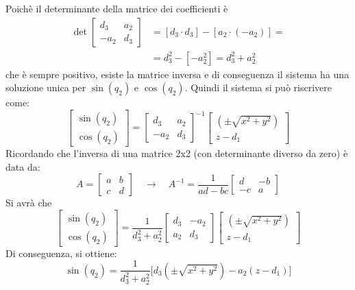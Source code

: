 ﻿\documentclass[11pt, a4paper]{article}
\begin{document}
Poichè il determinante della matrice dei coefficienti è
\begin{align*}
    \det \begin{bmatrix}
        d_{3} & a_{2} \\
        -a_{2} & d_{3}
    \end{bmatrix} &= [d_{3} \cdot d_{3}] - [a_{2} \cdot (- a_{2})] =\\
    & = d_{3}^{2} - [-a_{2}^{2}] = d_{3}^{2} + a_{2}^{2}
\end{align*}
che è sempre positivo, esiste la matrice inversa e di conseguenza il sistema ha una soluzione unica per $\sin(q_2)$ e $\cos(q_2)$. Quindi il sistema si può riscrivere come:
\[
    \begin{bmatrix}
        \sin(q_2)\\
        \cos(q_2)
    \end{bmatrix}
    =
    \begin{bmatrix}
        d_{3} & a_{2} \\
        -a_{2} & d_{3}
    \end{bmatrix}^{-1}
    \begin{bmatrix}
        (\pm \sqrt{x^2+y^2}) \\
        z - d_1
    \end{bmatrix}
\]
Ricordando che l'inversa di una matrice 2x2 (con determinante diverso da zero) è data da:
\[
A=\begin{bmatrix}
a & b\\
c & d
\end{bmatrix}
\quad\longrightarrow\quad
A^{-1}=
\frac{1}{ad-bc}
\begin{bmatrix}
    d & -b \\
    -c & a
\end{bmatrix}
\]
Si avrà che
\[
    \begin{bmatrix}
        \sin(q_2)\\
        \cos(q_2)
    \end{bmatrix}
    =
    \frac{1}{d_{3}^{2} + a_{2}^{2}}
    \begin{bmatrix}
        d_{3} & -a_{2} \\
        a_{2} & d_{3}
    \end{bmatrix}
    \begin{bmatrix}
        (\pm \sqrt{x^2+y^2}) \\
        z - d_1
    \end{bmatrix}
\]
Di conseguenza, si ottiene:
\[
    \boxed{
        \sin(q_{2}) = \frac{1}{d_{3}^{2} + a_{2}^{2}} \biggl[d_{3} (\pm \sqrt{x^2+y^2}) - a_{2} (z - d_1)\biggr]
    }
\]
\end{document}
